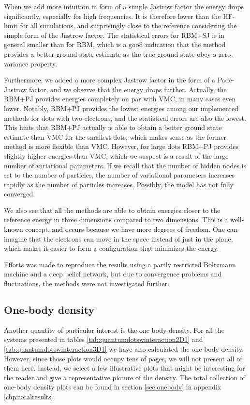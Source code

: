 When we add more intuition in form of a simple Jastrow factor the energy drops significantly, especially for high frequencies. It is therefore lower than the HF-limit for all simulations, and surprisingly close to the reference considering the simple form of the Jastrow factor. The statistical errors for RBM+SJ is in general smaller than for RBM, which is a good indication that the method provides a better ground state estimate as the true ground state obey a zero-variance property. 

Furthermore, we added a more complex Jastrow factor in the form of a Padé-Jastrow factor, and we observe that the energy drops further. Actually, the RBM+PJ provides energies completely on par with VMC, in many cases even lower. Notably, RBM+PJ provides the lowest energies among our implemented methods for dots with two electrons, and the statistical errors are also the lowest. This hints that RBM+PJ actually is able to obtain a better ground state estimate than VMC for the smallest dots, which makes sense as the former method is more flexible than VMC. However, for large dots RBM+PJ provides slightly higher energies than VMC, which we suspect is a result of the large number of variational parameters. If we recall that the number of hidden nodes is set to the number of particles, the number of variational parameters increases rapidly as the number of particles increases. Possibly, the model has not fully converged. 

We also see that all the methods are able to obtain energies closer to the reference energy in three dimensions compared to two dimensions. This is a well-known concept, and occurs because we have more degrees of freedom. One can imagine that the electrons can move in the space instead of just in the plane, which makes it easier to form a configuration that minimizes the energy. 

Efforts was made to reproduce the results using a partly restricted Boltzmann machine and a deep belief network, but due to convergence problems and fluctuations, the methods were not investigated further. 

\subsection{One-body density} \label{sec:onebodyresults}
Another quantity of particular interest is the one-body density. For all the systems presented in tables \eqref{tab:quantumdotswinteraction2D1} and \eqref{tab:quantumdotswinteraction3D1} we have also calculated the one-body density. However, since those plots would occupy tens of pages, we will not present all of them here. Instead, we select a few illustrative plots that might be interesting for the reader and give a representative picture of the density. The total collection of one-body density plots can be found in section \ref{sec:onebody} in appendix \ref{chp:totalresults}. 

